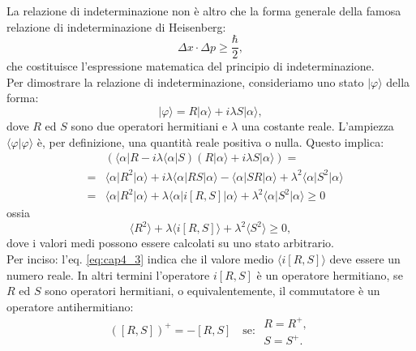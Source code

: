 \documentclass[a4paper,12pt,oneside]{book}
\begin{document}
La relazione di indeterminazione non è altro che la forma generale della famosa relazione di indeterminazione di Heisenberg:
\begin{equation}
\Delta x \cdot \Delta p \geq \frac{\hbar}{2},
\end{equation}
che costituisce l'espressione matematica del principio di indeterminazione.\\
Per dimostrare la relazione di indeterminazione, consideriamo uno stato $\vert \varphi \rangle$ della forma:
\begin{equation}
\vert \varphi \rangle = R\vert \alpha \rangle +i \lambda S \vert \alpha \rangle ,
\end{equation}
dove $R$ ed $S$ sono due operatori hermitiani e $\lambda $ una costante reale. L'ampiezza $\langle \varphi \vert \varphi \rangle$ è, per definizione, una quantità reale positiva o nulla. Questo implica:
\begin{eqnarray}
& &\left( \langle \alpha \vert R -i \lambda \langle \alpha \vert S \right) \left( R\vert \alpha \rangle +i \lambda S \vert \alpha \rangle  \right) =\nonumber \\
& = & \langle \alpha \vert R^2 \vert \alpha \rangle + i\lambda \langle \alpha \vert RS \vert \alpha \rangle - \langle \alpha \vert SR \vert \alpha \rangle + \lambda ^2 \langle \alpha \vert S^2 \vert \alpha \rangle\\
& = & \langle \alpha \vert R^2 \vert \alpha \rangle + \lambda \langle \alpha \vert i\left[ R,S\right] \vert \alpha \rangle + \lambda ^2 \langle \alpha \vert S^2 \vert \alpha \rangle \geq 0 \nonumber
\end{eqnarray}
ossia
\begin{equation}
\label{eq:cap4_3}
\langle  R^2  \rangle + \lambda \langle i\left[ R,S \right] \rangle + \lambda ^2 \langle S^2 \rangle \geq 0,
\end{equation}
dove i valori medi possono essere calcolati su uno stato arbitrario.\\
Per inciso: l'eq. \eqref{eq:cap4_3} indica che il valore medio $\langle i\left[ R,S \right] \rangle$ deve essere un numero reale. In altri termini l'operatore $i\left[R,S	\right]$ è un operatore hermitiano, se $R$ ed $S$ sono operatori hermitiani, o equivalentemente, il commutatore è un operatore antihermitiano:
\begin{equation}
\left( \left[R,S \right] \right) ^{+} = - \left[R,S \right] \quad \textrm{se: } \begin{array}{c}
R=R^{+},\\
S=S^{+}.
\end{array}
\end{equation}
\end{document}
